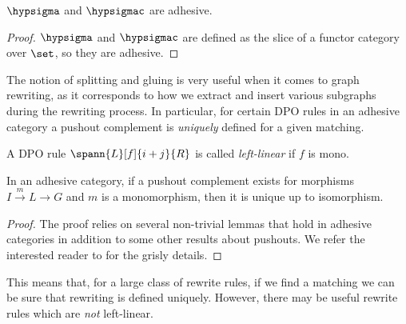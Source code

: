 \begin{corollary}
    \(\hypsigma\) and \(\hypsigmac\) are adhesive.
\end{corollary}
\begin{proof}
    \(\hypsigma\) and \(\hypsigmac\) are defined as the slice of a functor
    category over \(\set\), so they are adhesive.
\end{proof}

The notion of splitting and gluing is very useful when it comes to graph
rewriting, as it corresponds to how we extract and insert various subgraphs
during the rewriting process.
In particular, for certain DPO rules in an adhesive category a pushout
complement is \emph{uniquely} defined for a given matching.

\begin{definition}
    A DPO rule \(\spann{L}[f]{i+j}{R}\) is called \emph{left-linear} if \(f\)
    is mono.
\end{definition}

\begin{theorem}
    In an adhesive category, if a pushout complement exists for morphisms
    \(I \xrightarrow{m} L \to G\) and \(m\) is a monomorphism, then it is unique
    up to isomorphism.
\end{theorem}
\begin{proof}
    The proof relies on several non-trivial lemmas that hold in adhesive
    categories in addition to some other results about pushouts.
    We refer the interested reader to
    \cite[Lems. 4.3.6 - 4.3.9]{kissinger2012pictures} for the grisly details.
\end{proof}

This means that, for a large class of rewrite rules, if we find a matching we
can be sure that rewriting is defined uniquely.
However, there may be useful rewrite rules which are \emph{not} left-linear.

